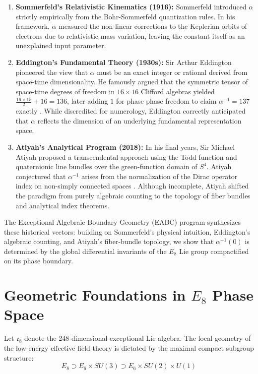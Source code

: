 \documentclass[11pt,a4paper]{article}
\begin{document}
\begin{enumerate}
    \item \textbf{Sommerfeld's Relativistic Kinematics (1916):} Sommerfeld introduced $\alpha$ strictly empirically from the Bohr-Sommerfeld quantization rules. In his framework, $\alpha$ measured the non-linear corrections to the Keplerian orbits of electrons due to relativistic mass variation, leaving the constant itself as an unexplained input parameter.
    
    \item \textbf{Eddington's Fundamental Theory (1930s):} Sir Arthur Eddington pioneered the view that $\alpha$ must be an exact integer or rational derived from space-time dimensionality. He famously argued that the symmetric tensor of space-time degrees of freedom in $16 \times 16$ Clifford algebras yielded $\frac{16 \times 15}{2} + 16 = 136$, later adding $1$ for phase phase freedom to claim $\alpha^{-1} = 137$ exactly \cite{eddington1936}. While discredited for numerology, Eddington correctly anticipated that $\alpha$ reflects the dimension of an underlying fundamental representation space.
    
    \item \textbf{Atiyah's Analytical Program (2018):} In his final years, Sir Michael Atiyah proposed a transcendental approach using the Todd function and quaternionic line bundles over the green-function domain of $S^4$. Atiyah conjectured that $\alpha^{-1}$ arises from the normalization of the Dirac operator index on non-simply connected spaces \cite{atiyah2018}. Although incomplete, Atiyah shifted the paradigm from purely algebraic counting to the topology of fiber bundles and analytical index theorems.
\end{enumerate}

The Exceptional Algebraic Boundary Geometry (EABC) program synthesizes these historical vectors: building on Sommerfeld's physical intuition, Eddington's algebraic counting, and Atiyah's fiber-bundle topology, we show that $\alpha^{-1}(0)$ is determined by the global differential invariants of the $E_8$ Lie group compactified on its phase boundary.

\section{Geometric Foundations in $E_8$ Phase Space}

Let $\mathfrak{e}_8$ denote the 248-dimensional exceptional Lie algebra. The local geometry of the low-energy effective field theory is dictated by the maximal compact subgroup structure:
\begin{equation}
    E_8 \supset E_6 \times SU(3) \supset E_6 \times SU(2) \times U(1)
\end{equation}
\end{document}
